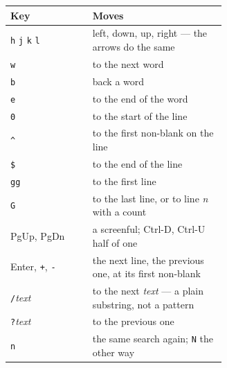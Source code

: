 \begin{center}
\small
\begin{tabular}{@{}l >{\raggedright\arraybackslash}p{0.62\linewidth}@{}}
\toprule
\textbf{Key} & \textbf{Moves} \\
\midrule
\texttt{h} \texttt{j} \texttt{k} \texttt{l} & left, down, up, right --- the arrows do the same \\
\texttt{w} & to the next word \\
\texttt{b} & back a word \\
\texttt{e} & to the end of the word \\
\texttt{0} & to the start of the line \\
\texttt{\textasciicircum} & to the first non-blank on the line \\
\texttt{\$} & to the end of the line \\
\texttt{gg} & to the first line \\
\texttt{G} & to the last line, or to line \emph{n} with a count \\
PgUp, PgDn & a screenful; Ctrl-D, Ctrl-U half of one \\
Enter, \texttt{+}, \texttt{-} & the next line, the previous one, at its first non-blank \\
\texttt{/}\emph{text} & to the next \emph{text} --- a plain substring, not a pattern \\
\texttt{?}\emph{text} & to the previous one \\
\texttt{n} & the same search again; \texttt{N} the other way \\
\bottomrule
\end{tabular}
\end{center}

